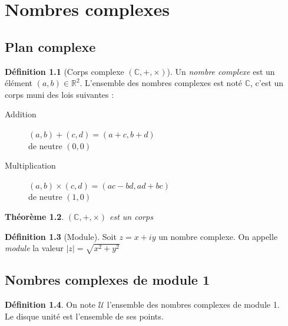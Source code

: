 \documentclass[11pt,a4paper]{report}
\newtheorem{theorem}{Théorème}[chapter]
\theoremstyle{definition}
\newtheorem{dfn}[theorem]{Définition}
\begin{document}
\chapter{Nombres complexes} %
\label{cha:nombres_complexes}
\section{Plan complexe} %
\label{sec:plan_complexe}
\begin{dfn}[Corps complexe $(\ensuremath{\mathbb{C}},+,\times{})$]
     Un \emph{nombre complexe} est un élément $(a,b) \in \ensuremath{\mathbb{R}}^2$. L'ensemble des nombres complexes est noté \ensuremath{\mathbb{C}}, c'est un corps muni des lois suivantes : 
     \begin{description}
         \item[Addition] $(a,b) + (c,d) = (a+c,b+d)$\hfill \\de neutre $(0,0)$
         \item[Multiplication] $(a,b) \times (c,d) = (ac - bd, ad + bc)$\hfill \\de neutre $(1,0)$
     \end{description}
\end{dfn}
\begin{theorem}
     $(\ensuremath{\mathbb{C}},+,\times{})$ est un corps 
\end{theorem}
\begin{dfn}[Module]
     Soit $z=x+iy$ un nombre complexe. On appelle \emph{module} la valeur $|z| = \sqrt{x^2 + y^2}$
\end{dfn}

\section{Nombres complexes de module 1} %
\label{sec:nombres_complexes_de_module_1}
\begin{dfn}
     On note $\mathcal{U}$ l'ensemble des nombres complexes de module 1.\\
     Le disque unité est l'ensemble de ses points.
\end{dfn}
\end{document}

